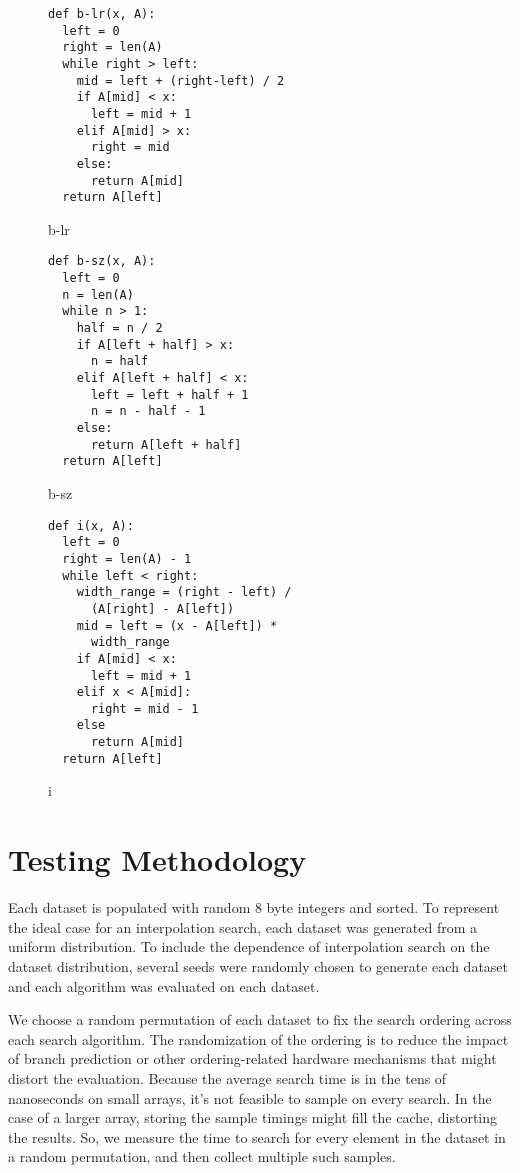 \documentclass[twocolumn]{article}
\begin{document}
\begin{figure}[ht]
\begin{verbatim}
def b-lr(x, A):
  left = 0
  right = len(A)
  while right > left:
    mid = left + (right-left) / 2
    if A[mid] < x:
      left = mid + 1
    elif A[mid] > x:
      right = mid 
    else:
      return A[mid]
  return A[left]
\end{verbatim}
\caption{b-lr}
  \label{b-lr}
\end{figure}

\begin{figure}[ht]
\begin{verbatim}
def b-sz(x, A):
  left = 0
  n = len(A)
  while n > 1:
    half = n / 2
    if A[left + half] > x:
      n = half
    elif A[left + half] < x:
      left = left + half + 1
      n = n - half - 1
    else:
      return A[left + half]
  return A[left]
\end{verbatim}
\caption{b-sz}
  \label{b-sz}
\end{figure}

\begin{figure}[ht]
\begin{verbatim}
def i(x, A):
  left = 0
  right = len(A) - 1
  while left < right:
    width_range = (right - left) /
      (A[right] - A[left])
    mid = left = (x - A[left]) *
      width_range
    if A[mid] < x:
      left = mid + 1
    elif x < A[mid]:
      right = mid - 1
    else
      return A[mid]
  return A[left]
\end{verbatim}
\caption{i}
  \label{i}
\end{figure}

\section{Testing Methodology}

Each dataset is populated with random 8 byte integers and sorted. To represent the ideal case for an interpolation search, each dataset was generated from a uniform distribution. To include the dependence of interpolation search on the dataset distribution, several seeds were randomly chosen to generate each dataset and each algorithm was evaluated on each dataset.

We choose a random permutation of each dataset to fix the search ordering across each search algorithm. The randomization of the ordering is to reduce the impact of branch prediction or other ordering-related hardware mechanisms that might distort the evaluation. Because the average search time is in the tens of nanoseconds on small arrays, it's not feasible to sample on every search. In the case of a larger array, storing the sample timings might fill the cache, distorting the results. So, we measure the time to search for every element in the dataset in a random permutation, and then collect multiple such samples.
\end{document}
